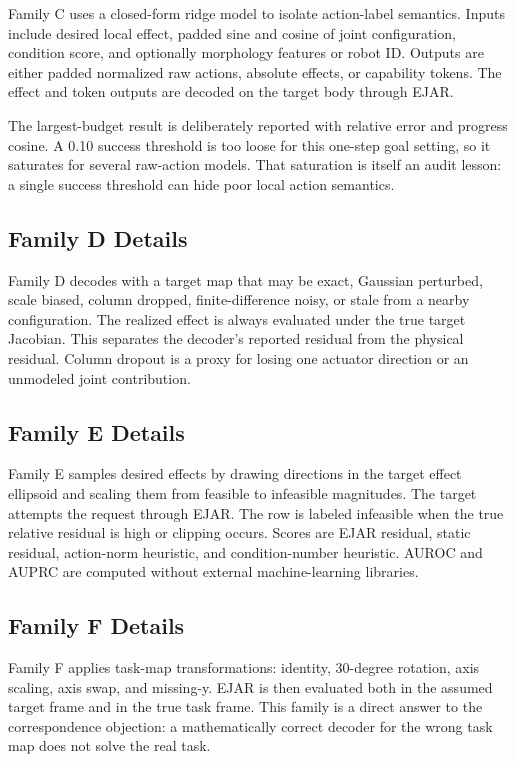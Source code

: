 \documentclass{article}
\begin{document}
Family C uses a closed-form ridge model to isolate action-label semantics. Inputs include desired local effect, padded sine and cosine of joint configuration, condition score, and optionally morphology features or robot ID. Outputs are either padded normalized raw actions, absolute effects, or capability tokens. The effect and token outputs are decoded on the target body through EJAR.

The largest-budget result is deliberately reported with relative error and progress cosine. A 0.10 success threshold is too loose for this one-step goal setting, so it saturates for several raw-action models. That saturation is itself an audit lesson: a single success threshold can hide poor local action semantics.

\subsection{Family D Details}

Family D decodes with a target map that may be exact, Gaussian perturbed, scale biased, column dropped, finite-difference noisy, or stale from a nearby configuration. The realized effect is always evaluated under the true target Jacobian. This separates the decoder's reported residual from the physical residual. Column dropout is a proxy for losing one actuator direction or an unmodeled joint contribution.

\subsection{Family E Details}

Family E samples desired effects by drawing directions in the target effect ellipsoid and scaling them from feasible to infeasible magnitudes. The target attempts the request through EJAR. The row is labeled infeasible when the true relative residual is high or clipping occurs. Scores are EJAR residual, static residual, action-norm heuristic, and condition-number heuristic. AUROC and AUPRC are computed without external machine-learning libraries.

\subsection{Family F Details}

Family F applies task-map transformations: identity, 30-degree rotation, axis scaling, axis swap, and missing-y. EJAR is then evaluated both in the assumed target frame and in the true task frame. This family is a direct answer to the correspondence objection: a mathematically correct decoder for the wrong task map does not solve the real task.
\end{document}
